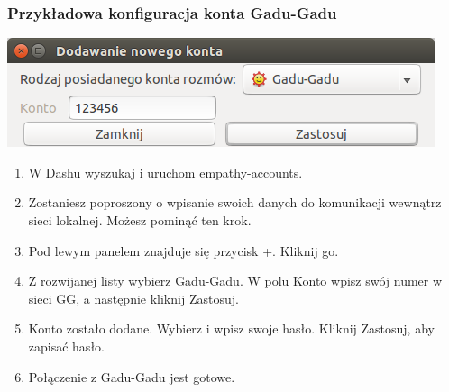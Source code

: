 \subsubsection{Przykładowa konfiguracja konta Gadu-Gadu}
\begin{center}
	\includegraphics[width=\linewidth]{images/programy_empathy1.png}
\end{center}
\begin{enumerate}
\item W Dashu wyszukaj i uruchom \textcolor{ubuntu_orange}{empathy-accounts}.
\item Zostaniesz poproszony o wpisanie swoich danych do komunikacji wewnątrz sieci lokalnej. Możesz pominąć ten krok.
\item Pod lewym panelem znajduje się przycisk \textcolor{ubuntu_orange}{+}. Kliknij go.
\item Z rozwijanej listy wybierz \textcolor{ubuntu_orange}{Gadu-Gadu}. W polu \textcolor{ubuntu_orange}{Konto} wpisz swój numer w sieci GG, a następnie kliknij \textcolor{ubuntu_orange}{Zastosuj}.
\item Konto zostało dodane. Wybierz  i wpisz swoje hasło. Kliknij \textcolor{ubuntu_orange}{Zastosuj}, aby zapisać hasło.
\item Połączenie z Gadu-Gadu jest gotowe.
\end{enumerate}
\clearpage
